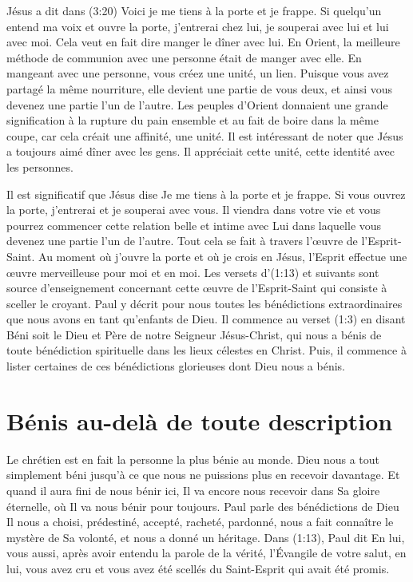Jésus a dit dans (3:20)\frcolon{}
 \Og Voici\frcolon{} je me tiens à la porte et je frappe.
 Si quelqu'un entend ma voix et ouvre la porte,
 j'entrerai chez lui, je souperai avec lui et lui avec moi. \Fg{}
 Cela veut en fait dire\frcolon{} \Og manger le dîner avec lui. \Fg{}
 En Orient, la meilleure méthode de communion avec une personne
 était de manger avec elle. En mangeant avec une personne,
 vous créez une unité, un lien.
 Puisque vous avez partagé la même nourriture, elle devient une partie
 de vous deux, et ainsi vous devenez une partie l'un de l'autre.
 Les peuples d'Orient donnaient une grande signification à la rupture
 du pain ensemble et au fait de boire dans la même coupe,
 car cela créait une affinité, une unité.
 Il est intéressant de noter que Jésus a toujours aimé dîner avec les gens.
 Il appréciait cette unité, cette identité avec les personnes.


Il est significatif que Jésus dise\frcolon{}
 \Og Je me tiens à la porte et je frappe.
 Si vous ouvrez la porte, j'entrerai et je souperai avec vous. \Fg{}
 Il viendra dans votre vie et vous pourrez commencer cette relation belle
 et intime avec Lui dans laquelle vous devenez une partie l'un de l'autre.
 Tout cela se fait à travers l'œuvre de l'Esprit-Saint.
 Au moment où j'ouvre la porte et où je crois en Jésus,
 l'Esprit effectue une œuvre merveilleuse pour moi et en moi.
 Les versets d'(1:13) et suivants sont source
 d'enseignement concernant cette œuvre de l'Esprit-Saint
 qui consiste à sceller le croyant.
 Paul y décrit pour nous toutes les bénédictions extraordinaires
 que nous avons en tant qu'enfants de Dieu.
 Il commence au verset (1:3) en disant\frcolon{}
 \Og Béni soit le Dieu et Père de notre Seigneur Jésus-Christ,
 qui nous a bénis de toute bénédiction spirituelle
 dans les lieux célestes en Christ. \Fg{}
 Puis, il commence à lister certaines de ces bénédictions glorieuses
 dont Dieu nous a bénis.


\section{B\'enis au-del\`a de toute description}

Le chrétien est en fait la personne la plus bénie au monde.
 Dieu nous a tout simplement béni jusqu'à ce que nous ne puissions plus
 en recevoir davantage.
 Et quand il aura fini de nous bénir ici, Il va encore nous recevoir
 dans Sa gloire éternelle, où Il va nous bénir pour toujours.
 Paul parle des bénédictions de Dieu\frcolon{} Il nous a choisi, prédestiné,
 accepté, racheté, pardonné, nous a fait connaître
 le mystère de Sa volonté, et nous a donné un héritage.
 Dans (1:13), Paul dit\frcolon{}
 \Og En lui, vous aussi, après avoir entendu la parole de la vérité,
 l'Évangile de votre salut, en lui, vous avez cru et vous avez été scellés
 du Saint-Esprit qui avait été promis. \Fg{}

